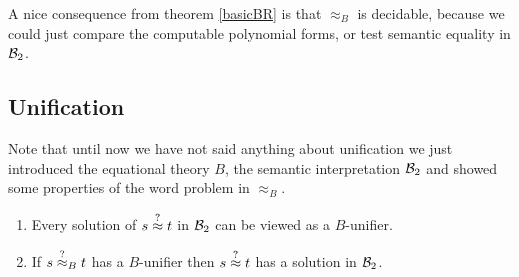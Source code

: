 		A nice consequence from theorem \ref{basicBR} is that $\approx_B$ is decidable, because we could just compare the computable polynomial forms, or test semantic equality in ${\mathcal{B}_2}$.
		\subsection{Unification}
		Note that until now we have not said anything about unification we just introduced the equational theory $B$, the semantic interpretation ${\mathcal{B}_2}$ and showed some properties of the word problem in $\approx_B$.
		\begin{lemma}\mbox{}
		\begin{enumerate}
		\item Every solution of $s\stackrel{?}{\approx} t$ in ${\mathcal{B}_2}$ can be viewed as a $B$-unifier.
		\item If $s\stackrel{?}{\approx}_B t$ has a $B$-unifier then $s\stackrel{?}{\approx} t$ has a solution in ${\mathcal{B}_2}$.
		\end{enumerate}
		\end{lemma}
